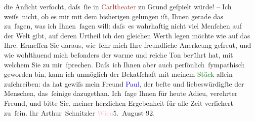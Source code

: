                die Anſicht verfocht, daſs ſie in \textcolor{brown}{Carltheater}\ledrightnote{\textcolor{brown}{Carl-Theater}} zu
               Grund geſpielt {\pb}würde! – Ich weiſs nicht, ob es mir mit dem
               bisherigen gelungen iſt, Ihnen gerade das zu ſagen, was ich Ihnen ſagen will: daſs es
               wahrhaftig nicht viel Menſchen auf der Welt gibt, auf deren Urtheil ich den gleichen
               Werth legen möchte wie auf das Ihre. Ermeſſen Sie daraus, wie ſehr mich Ihre
               freundliche Anerke{\geminationn}ung gefreut, und wie wohlthuend mich
               beſonders {\pb}der warme und reiche Ton berührt hat, mit welchem
               Sie zu mir ſprechen. Daſs ich Ihnen aber auch perſönlich ſympathisch geworden bin,
               kann ich unmöglich der Beka{\geminationn}tſchaft mit meinem \textcolor{green}{Stück}\ledrightnote{{$\rightarrow$}\emph{\textcolor{green}{Das Märchen. Schauspiel in drei Aufzügen}}} allein zuſchreiben: da
               hat gewiſs mein Freund \textcolor{blue}{Paul}\ledrightnote{\textcolor{blue}{Paul Goldmann}}, der beſte und
               liebeswürdigſte der Menschen, das ſeinige dazugethan. Ich ſage Ihnen für heute Adieu,
                  {\pb}verehrter Freund, und bitte Sie, meiner herzlichen
               Ergebenheit für alle Zeit verſichert zu ſein.\pend
           \pstart Ihr \spacefill\mbox{Arthur Schnitzler}\pend{}
\pstart
           \textcolor{pink}{Wien}\ledrightnote{\textcolor{pink}{Wien}}{ }5. August 92.\pend
           \endnumbering{}  \newcommand{\dateiname}{L03901}\newcommand{\titel}{Arthur Schnitzler an Theodor Herzl, 5. 8. 1892}\newcommand{\editorInnen}{Herausgegeben von Jahnke, SelmaMüller, Martin Anton}
